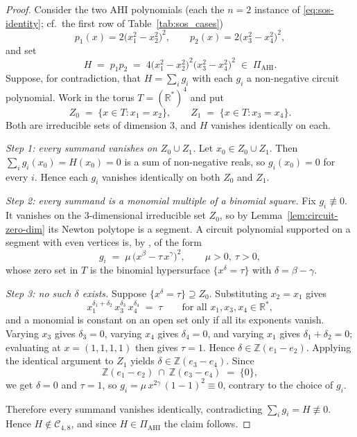 \documentclass[12pt]{elsarticle}
\theoremstyle{definition}
\newcommand{\AHI}{\mathrm{AHI}}
\newcommand{\PiAHI}{\Pi_{\AHI}}
\newcommand{\SONC}{\mathcal{C}}
\begin{document}
\begin{proof}
Consider the two AHI polynomials (each the $n=2$ instance of \eqref{eq:sos-identity}; cf.\ the first row of Table~\ref{tab:sos_cases})
\[
p_1(x) = 2\big(x_1^2-x_2^2\big)^2, \qquad p_2(x) = 2\big(x_3^2-x_4^2\big)^2,
\]
and set
\[
H \;=\; p_1 p_2 \;=\; 4\big(x_1^2-x_2^2\big)^2\big(x_3^2-x_4^2\big)^2 \;\in\; \PiAHI .
\]
Suppose, for contradiction, that $H = \sum_{i} g_i$ with each $g_i$ a non-negative circuit polynomial. Work in the torus $T=(\mathbb{R}^{*})^{4}$ and put
\[
Z_{0} \;=\; \big\{x\in T: x_1=x_2\big\},
\qquad
Z_{1} \;=\; \big\{x\in T: x_3=x_4\big\} .
\]
Both are irreducible sets of dimension $3$, and $H$ vanishes identically on each.
 
\emph{Step 1: every summand vanishes on $Z_0\cup Z_1$.}
Let $x_{0}\in Z_{0}\cup Z_{1}$. Then $\sum_i g_i(x_{0}) = H(x_{0}) = 0$ is a sum of non-negative reals, so $g_i(x_{0})=0$ for every $i$. Hence each $g_i$ vanishes identically on both $Z_{0}$ and $Z_{1}$.
 
\emph{Step 2: every summand is a monomial multiple of a binomial square.}
Fix $g_i\not\equiv 0$. It vanishes on the $3$-dimensional irreducible set $Z_{0}$, so by Lemma~\ref{lem:circuit-zero-dim} its Newton polytope is a segment. A circuit polynomial supported on a segment with even vertices is, by \citep[Lemma~3.7 and Theorem~3.8]{iliman2016amoebas}, of the form
\[
g_i \;=\; \mu\,\big(x^{\beta}-\tau\,x^{\gamma}\big)^{2}, \qquad \mu>0,\ \tau>0,
\]
whose zero set in $T$ is the binomial hypersurface $\{x^{\delta}=\tau\}$ with $\delta=\beta-\gamma$.
 
\emph{Step 3: no such $\delta$ exists.}
Suppose $\{x^{\delta}=\tau\}\supseteq Z_{0}$. Substituting $x_2=x_1$ gives
\[
x_1^{\delta_1+\delta_2}\,x_3^{\delta_3}\,x_4^{\delta_4} \;=\; \tau
\qquad\text{for all } x_1,x_3,x_4\in\mathbb{R}^{*},
\]
and a monomial is constant on an open set only if all its exponents vanish. Varying $x_3$ gives $\delta_3=0$, varying $x_4$ gives $\delta_4=0$, and varying $x_1$ gives $\delta_1+\delta_2=0$; evaluating at $x=(1,1,1,1)$ then gives $\tau=1$. Hence $\delta\in\mathbb{Z}(e_1-e_2)$. Applying the identical argument to $Z_{1}$ yields $\delta\in\mathbb{Z}(e_3-e_4)$. Since
\[
\mathbb{Z}(e_1-e_2)\ \cap\ \mathbb{Z}(e_3-e_4) \;=\; \{0\},
\]
we get $\delta=0$ and $\tau=1$, so $g_i = \mu\,x^{2\gamma}\,(1-1)^{2} \equiv 0$, contrary to the choice of $g_i$.
 
Therefore every summand vanishes identically, contradicting $\sum_i g_i = H \not\equiv 0$. Hence $H\notin\SONC_{4,8}$, and since $H\in\PiAHI$ the claim follows.
\end{proof}
\end{document}
